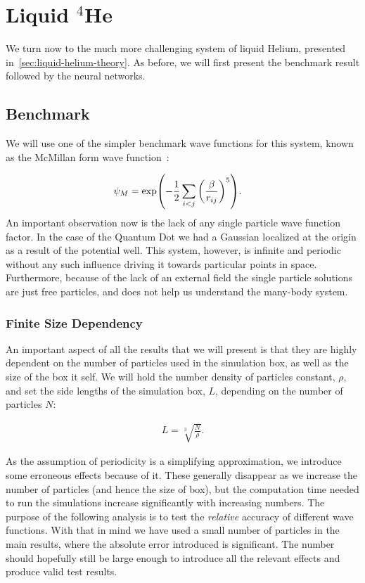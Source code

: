 \documentclass[Thesis.tex]{subfiles}
\begin{document}
\chapter{Liquid $^4$He}
\label{chp:liquid-helium}

We turn now to the much more challenging system of liquid Helium, presented
in~\cref{sec:liquid-helium-theory}. As before, we will first present the
benchmark result followed by the neural networks.


\section{Benchmark}

We will use one of the simpler benchmark wave functions for this system, known
as the McMillan form wave function~\cite{McMillan-1965}:

\begin{align}
  \label{eq:McMillan-wave-function-def}
  \psi_{M} &= \exp(-\frac{1}{2}\sum_{i<j} \qty(\frac{\beta}{r_{ij}})^5).
\end{align}
An important observation now is the lack of any single particle wave
function factor. In the case of the Quantum Dot we had a Gaussian localized at
the origin as a result of the potential well. This system, however, is infinite
and periodic without any such influence driving it towards particular points in
space. Furthermore, because of the lack of an external field the single particle
solutions are just free particles, and does not help us understand the many-body
system.

\subsection{Finite Size Dependency}

An important aspect of all the results that we will present is that they are
highly dependent on the number of particles used in the simulation box, as well
as the size of the box it self. We will hold the number density of particles
constant, $\rho$, and set the side lengths of the simulation box, $L$, depending on
the number of particles $N$:

\begin{align}
  L = \sqrt[3]{\frac{N}{\rho}}.
\end{align}

\noindent As the assumption of periodicity is a simplifying approximation, we
introduce some erroneous effects because of it. These generally disappear as we
increase the number of particles (and hence the size of box), but the
computation time needed to run the simulations increase significantly with
increasing numbers. The purpose of the following analysis is to test the
\emph{relative} accuracy of different wave functions. With that in mind we have
used a small number of particles in the main results, where the absolute error
introduced is significant. The number should hopefully still be large enough to
introduce all the relevant effects and produce valid test results.
\end{document}

